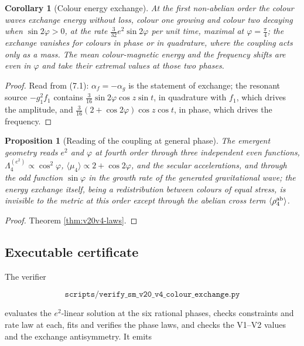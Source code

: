 \documentclass[11pt]{article}
\newtheorem{proposition}[theorem]{Proposition}
\newtheorem{corollary}[theorem]{Corollary}
\theoremstyle{remark}
\begin{document}
\begin{corollary}[Colour energy exchange]
\label{cor:v20v4-exchange}
At the first non-abelian order the colour waves exchange energy
without loss, colour one growing and colour two decaying when
\(\sin2\varphi>0\), at the rate \(\tfrac3{32}e^2\sin2\varphi\) per unit
time, maximal at \(\varphi=\tfrac\pi4\); the exchange vanishes for
colours in phase or in quadrature, where the coupling acts only as a
mass.  The mean colour-magnetic energy and the frequency shifts are
even in \(\varphi\) and take their extremal values at those two phases.
\end{corollary}

\begin{proof}
Read from (7.1): \(\alpha_f=-\alpha_g\) is the statement of exchange;
the resonant source \(-g_1^2f_1\) contains
\(\tfrac3{16}\sin2\varphi\cos z\sin t\), in quadrature with \(f_1\),
which drives the amplitude, and \(\tfrac3{16}(2+\cos2\varphi)\cos z\cos t\),
in phase, which drives the frequency.
\end{proof}

\begin{proposition}[Reading of the coupling at general phase]
\label{prop:v20v4-reading}
The emergent geometry reads \(e^2\) and \(\varphi\) at fourth order
through three independent even functions,
\(\Lambda_4^{(e^2)}\propto\cos^2\varphi\),
\(\langle\mu_4\rangle\propto2+\cos2\varphi\), and the secular
accelerations, and through the odd function \(\sin\varphi\) in the
growth rate of the generated gravitational wave; the energy exchange
itself, being a redistribution between colours of equal stress, is
invisible to the metric at this order except through the abelian
cross term \(\langle\rho^{\rm ab}_4\rangle\).
\end{proposition}

\begin{proof}
Theorem \ref{thm:v20v4-laws}.
\end{proof}

\subsection{Executable certificate}

The verifier

\[
 \texttt{scripts/verify\_sm\_v20\_v4\_colour\_exchange.py}            \tag{7.3}
\]

evaluates the \(e^2\)-linear solution at the six rational phases,
checks constraints and rate law at each, fits and verifies the phase
laws, and checks the V1--V2 values and the exchange antisymmetry.  It
emits
\end{document}
